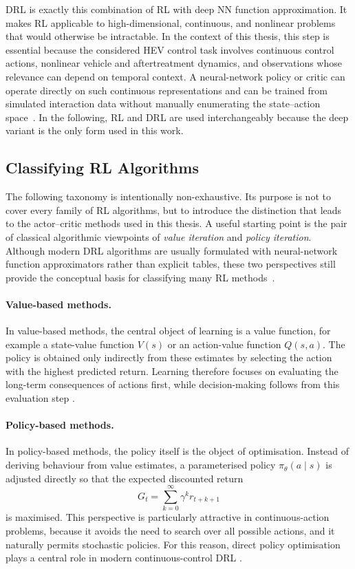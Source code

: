 \ac{DRL} is exactly this combination of \ac{RL} with deep \ac{NN} function approximation. It makes \ac{RL} applicable to high-dimensional, continuous, and nonlinear problems that would otherwise be intractable. In the context of this thesis, this step is essential because the considered \ac{HEV} control task involves continuous control actions, nonlinear vehicle and aftertreatment dynamics, and observations whose relevance can depend on temporal context. A neural-network policy or critic can operate directly on such continuous representations and can be trained from simulated interaction data without manually enumerating the state--action space~\cite{lillicrap_continuous_2019, sutton_reinforcement_2020}. In the following, \ac{RL} and \ac{DRL} are used interchangeably because the deep variant is the only form used in this work.

\subsection{Classifying RL Algorithms}
The following taxonomy is intentionally non-exhaustive. Its purpose is not to cover every family of \ac{RL} algorithms, but to introduce the distinction that leads to the actor--critic methods used in this thesis. A useful starting point is the pair of classical algorithmic viewpoints of \emph{value iteration} and \emph{policy iteration}. Although modern \ac{DRL} algorithms are usually formulated with neural-network function approximators rather than explicit tables, these two perspectives still provide the conceptual basis for classifying many \ac{RL} methods~\cite{sutton_reinforcement_2020}.

\paragraph{Value-based methods.} In value-based methods, the central object of learning is a value function, for example a state-value function $V(s)$ or an action-value function $Q(s,a)$. The policy is obtained only indirectly from these estimates by selecting the action with the highest predicted return. Learning therefore focuses on evaluating the long-term consequences of actions first, while decision-making follows from this evaluation step \cite{sutton_reinforcement_2020}.

\paragraph{Policy-based methods.} In policy-based methods, the policy itself is the object of optimisation. Instead of deriving behaviour from value estimates, a parameterised policy $\pi_{\theta}(a \mid s)$ is adjusted directly so that the expected discounted return
\begin{equation}
  G_t = \sum_{k=0}^{\infty} \gamma^k r_{t+k+1}
\end{equation}
is maximised. This perspective is particularly attractive in continuous-action problems, because it avoids the need to search over all possible actions, and it naturally permits stochastic policies. For this reason, direct policy optimisation plays a central role in modern continuous-control DRL \cite{sutton_reinforcement_2020, lillicrap_continuous_2019}.

